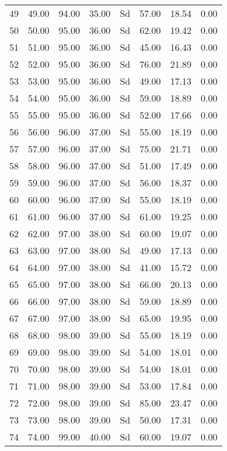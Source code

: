 \documentclass{article}
\begin{document}
\begin{table}[ht]
\begin{tabular}{rrrrlrrr}
  49 & 49.00 & 94.00 & 35.00 & Sd & 57.00 & 18.54 & 0.00 \\ 
  50 & 50.00 & 95.00 & 36.00 & Sd & 62.00 & 19.42 & 0.00 \\ 
  51 & 51.00 & 95.00 & 36.00 & Sd & 45.00 & 16.43 & 0.00 \\ 
  52 & 52.00 & 95.00 & 36.00 & Sd & 76.00 & 21.89 & 0.00 \\ 
  53 & 53.00 & 95.00 & 36.00 & Sd & 49.00 & 17.13 & 0.00 \\ 
  54 & 54.00 & 95.00 & 36.00 & Sd & 59.00 & 18.89 & 0.00 \\ 
  55 & 55.00 & 95.00 & 36.00 & Sd & 52.00 & 17.66 & 0.00 \\ 
  56 & 56.00 & 96.00 & 37.00 & Sd & 55.00 & 18.19 & 0.00 \\ 
  57 & 57.00 & 96.00 & 37.00 & Sd & 75.00 & 21.71 & 0.00 \\ 
  58 & 58.00 & 96.00 & 37.00 & Sd & 51.00 & 17.49 & 0.00 \\ 
  59 & 59.00 & 96.00 & 37.00 & Sd & 56.00 & 18.37 & 0.00 \\ 
  60 & 60.00 & 96.00 & 37.00 & Sd & 55.00 & 18.19 & 0.00 \\ 
  61 & 61.00 & 96.00 & 37.00 & Sd & 61.00 & 19.25 & 0.00 \\ 
  62 & 62.00 & 97.00 & 38.00 & Sd & 60.00 & 19.07 & 0.00 \\ 
  63 & 63.00 & 97.00 & 38.00 & Sd & 49.00 & 17.13 & 0.00 \\ 
  64 & 64.00 & 97.00 & 38.00 & Sd & 41.00 & 15.72 & 0.00 \\ 
  65 & 65.00 & 97.00 & 38.00 & Sd & 66.00 & 20.13 & 0.00 \\ 
  66 & 66.00 & 97.00 & 38.00 & Sd & 59.00 & 18.89 & 0.00 \\ 
  67 & 67.00 & 97.00 & 38.00 & Sd & 65.00 & 19.95 & 0.00 \\ 
  68 & 68.00 & 98.00 & 39.00 & Sd & 55.00 & 18.19 & 0.00 \\ 
  69 & 69.00 & 98.00 & 39.00 & Sd & 54.00 & 18.01 & 0.00 \\ 
  70 & 70.00 & 98.00 & 39.00 & Sd & 54.00 & 18.01 & 0.00 \\ 
  71 & 71.00 & 98.00 & 39.00 & Sd & 53.00 & 17.84 & 0.00 \\ 
  72 & 72.00 & 98.00 & 39.00 & Sd & 85.00 & 23.47 & 0.00 \\ 
  73 & 73.00 & 98.00 & 39.00 & Sd & 50.00 & 17.31 & 0.00 \\ 
  74 & 74.00 & 99.00 & 40.00 & Sd & 60.00 & 19.07 & 0.00 \\ 

\end{tabular}
\end{table}
\end{document}
